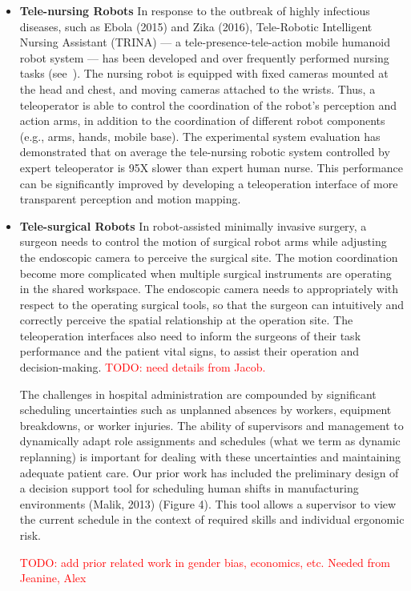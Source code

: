 \begin{itemize}
\item \textbf{Tele-nursing Robots} In response to the outbreak of highly infectious diseases, such as Ebola (2015) and Zika (2016), Tele-Robotic Intelligent Nursing Assistant (TRINA) --- a tele-presence-tele-action mobile humanoid robot system --- has been developed and over frequently performed nursing tasks (see~). The nursing robot is equipped with fixed cameras mounted at the head and chest, and moving cameras attached to the wrists. Thus, a teleoperator is able to control the coordination of the robot's perception and action arms, in addition to the coordination of different robot components (e.g., arms, hands, mobile base). The experimental system evaluation has demonstrated that on average the tele-nursing robotic system controlled by expert teleoperator is 95X slower than expert human nurse. This performance can be significantly improved by developing a teleoperation interface of more transparent perception and motion mapping. 


\item \textbf{Tele-surgical Robots} In robot-assisted minimally invasive surgery, a surgeon needs to control the motion of surgical robot arms while adjusting the endoscopic camera to perceive the surgical site. The motion coordination become more complicated when multiple surgical instruments are operating in the shared workspace. The endoscopic camera needs to appropriately with respect to the operating surgical tools, so that the surgeon can intuitively and correctly perceive the spatial relationship at the operation site. The teleoperation interfaces also need to inform the surgeons of their task performance and the patient vital signs, to assist their operation and decision-making. \textcolor{red}{TODO: need details from Jacob.}

The challenges in hospital administration are compounded by significant scheduling uncertainties such as unplanned absences by workers, equipment breakdowns, or worker injuries. The ability of supervisors and management to dynamically adapt role assignments and schedules (what we term as dynamic replanning) is important for dealing with these uncertainties and maintaining adequate patient care. Our prior work has included the preliminary design of a decision support tool for scheduling human shifts in manufacturing environments (Malik, 2013) (Figure 4). This tool allows a supervisor to view the current schedule in the context of required skills and individual ergonomic risk. 

\textcolor{red}{TODO: add prior related work in gender bias, economics, etc.  Needed from Jeanine, Alex}



\end{itemize}